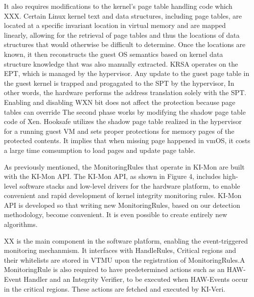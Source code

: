 \documentclass[conference]{IEEEtran}
\begin{document}
It also requires modifications to the kernel's page table handling code which XXX.%
Certain Linux kernel text and data structures, including page tables, are located at a specific invariant location in virtual memory and are mapped linearly, allowing for the retrieval of page tables and thus the locations of data structures that would otherwise be difficult to determine. Once the locations are known, it then reconstructs the guest OS semantics based on kernel data structure knowledge that was also manually extracted. 
KRSA operates on the EPT, which is managed by the hypervisor. 
Any update to the guest page table in the guest kernel is trapped and progagated to the SPT by the hypervisor, In other words, the hardware performs the address translation solely with the SPT. 
Enabling and disabling WXN bit does not affect the protection because page tables can override
The second phase works by modifying the shadow page table code of Xen.%
Hooksafe utilizes the shadow page table realized in the hypervisor for a running guest VM and sets proper protections for memory pages of the protected contents. %
It implies that when missing page happened in vmOS, it costs a large time comsumption to load pages and update page table. %


As previously mentioned, the MonitoringRules that operate in KI-Mon are built with the KI-Mon API. The KI-Mon API, as shown in Figure 4, includes high-level software stacks and low-level drivers for the hardware platform, to enable convenient and rapid development of kernel integrity monitoring rules. KI-Mon API is developed so that writing new MonitoringRules, based on our detection methodology, become convenient. It is even possible to create entirely new algorithms. 

XX is the main component in the software platform, enabling the event-triggered monitoring mechanmism.
It interfaces with HandleRules, 
Critical regions and their whitelists are stored in VTMU upon the registration of MonitoringRules.A MonitoringRule is also required to have predetermined actions such as an HAW-Event Handler and an Integrity Verifier, to be executed when HAW-Events occur in the critical regions. These actions are fetched and executed by KI-Veri.
\end{document}
